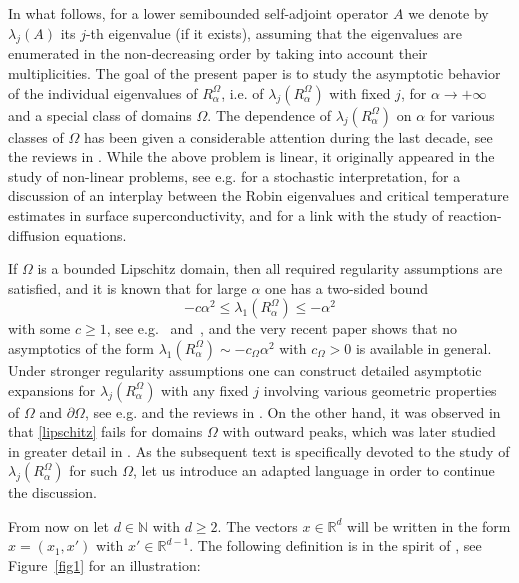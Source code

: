 \documentclass[11pt,oneside,reqno,a4paper]{amsart}
\newcommand{\N}{\mathbb{N}}
\newcommand{\R}{\mathbb{R}}
\theoremstyle{definition}
\begin{document}
In what follows, for a lower semibounded self-adjoint operator $A$ we denote by $\lambda_j(A)$ its $j$-th eigenvalue (if it exists), assuming that the eigenvalues are enumerated in the non-decreasing order  by taking into account their multiplicities. The goal of the present paper is to study the asymptotic behavior of the individual eigenvalues of $R^\Omega_\alpha$, i.e. of $\lambda_j(R^\Omega_\alpha)$ with fixed $j$, for $\alpha\to+\infty$ and a special class of domains $\Omega$. The dependence of $\lambda_j(R_\alpha^\Omega)$ on $\alpha$ for various classes of $\Omega$ has been given a considerable attention during the last decade, see the reviews in \cite{DFK,kobp}. While the above problem is linear, it originally appeared
in the study of non-linear problems, see e.g. \cite{DC} for a stochastic interpretation,
\cite{GS} for a discussion of an interplay between the Robin eigenvalues and critical temperature estimates in surface
superconductivity, and \cite{LOS} for a link with the study of reaction-diffusion equations.


 If $\Omega$ is a bounded Lipschitz domain, then all required regularity assumptions are satisfied, and it is known that for large $\alpha$
one has a two-sided bound
\begin{equation}
	\label{lipschitz}
-c\alpha^2\le \lambda_1(R_\alpha^\Omega)\le-\alpha^2
\end{equation}
with some $c\ge 1$, see e.g.~\cite[Prop.~4.12]{DFK} and~\cite[Lem.~2.7]{kobp},
and
the very recent paper \cite{dp} shows that no asymptotics of the form $\lambda_1(R_\alpha^\Omega)\sim -c_\Omega \alpha^2$ with $c_\Omega>0$ is available in general. Under stronger regularity assumptions
one can construct detailed asymptotic expansions for $\lambda_j(R^\Omega_\alpha)$ with any fixed $j$ involving various geometric properties of $\Omega$ and $\partial\Omega$, see e.g. \cite{antunes,bp,dk,HK,kr,LP,pp}
and the reviews in \cite{DFK,kobp}. On the other hand,
it was observed in \cite{LP} that \eqref{lipschitz} fails for domains $\Omega$ with outward peaks, which was later studied in greater detail in \cite{kov}. As the subsequent text is specifically devoted to the study of $\lambda_j(R^\Omega_\alpha)$ for such $\Omega$, let us introduce an adapted language in order to continue the discussion.

From now on let $d\in\N$ with $d\ge 2$. The vectors $x\in\R^d$ will be written in the form $x=(x_1,x')$ with  $x'\in\R^{d-1}$. The following definition is in the spirit of \cite[Sec.~5.1.1]{mazya}, see Figure~\ref{fig1} for an illustration:
\end{document}
